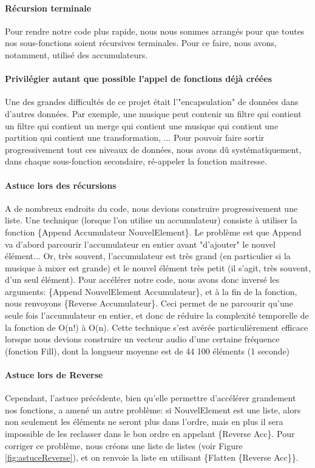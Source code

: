 \documentclass[10pt,a4paper]{article}
\begin{document}
\paragraph{Récursion terminale}
Pour rendre notre code plus rapide, nous nous sommes arrangés pour que toutes nos sous-fonctions
 soient récursives terminales. Pour ce faire, nous avons, notamment, utilisé des accumulateurs.
 
 \paragraph{Privilégier autant que possible l'appel de fonctions déjà créées} Une des grandes difficultés de ce projet était l'"encapsulation" de données dans d'autres données. Par exemple, une musique peut contenir un filtre qui contient un filtre qui contient un merge qui contient une musique qui contient une partition qui contient une transformation, ... Pour pouvoir faire sortir progressivement tout ces niveaux de données, nous avons dû systématiquement, dans chaque sous-fonction secondaire, ré-appeler la fonction maitresse.

\paragraph{Astuce lors des récursions}
A de nombreux endroits du code, nous devions construire progressivement une liste. Une technique (lorsque l'on utilise un accumulateur) consiste à utiliser la fonction \{Append Accumulateur NouvelElement\}. Le problème est que Append va d'abord parcourir l'accumulateur en entier avant "d'ajouter" le nouvel élément... Or, très souvent, l'accumulateur est très grand (en particulier si la musique à mixer est grande) et le nouvel élément très petit (il s'agit, très souvent, d'un seul élément). Pour accélérer notre code, nous avons donc inversé les arguments: \{Append NouvelElement Accumulateur\}, et à la fin de la fonction, nous renvoyons \{Reverse Accumulateur\}. Ceci permet de ne parcourir qu'une seule fois l'accumulateur en entier, et donc de réduire la complexité temporelle de la fonction de O(n!) à O(n). Cette technique s'est avérée particulièrement efficace lorsque nous devions construire un vecteur audio d'une certaine fréquence (fonction Fill), dont la longueur moyenne est de 44 100 éléments (1 seconde)

\paragraph{Astuce lors de Reverse} Cependant, l'astuce précédente, bien qu'elle permettre d'accélérer grandement nos fonctions, a amené un autre problème: si NouvelElement est une liste, alors non seulement les éléments ne seront plus dans l'ordre, mais en plus il sera impossible de les reclasser dans le bon ordre en appelant \{Reverse Acc\}. Pour corriger ce problème, nous créons une liste de listes (voir Figure \ref{fig:astuceReverse}), et on renvoie la liste en utilisant \{Flatten \{Reverse Acc\}\}.
\end{document}

